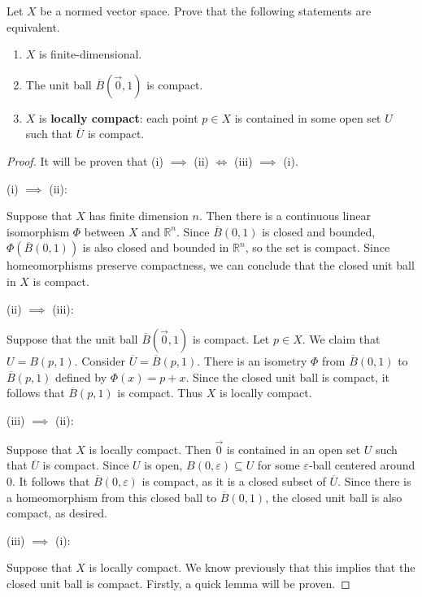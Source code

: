\documentclass{article}
\newcommand{\cl}[1]{\overline{#1}}
\theoremstyle{plain} %
\numberwithin{thm}{section} %
\theoremstyle{definition}
\begin{document}
        Let $X$ be a normed vector space. Prove that the following statements are equivalent.
        \begin{enumerate}[label=(\roman*)]
            \item $X$ is finite-dimensional.
            \item The unit ball $\cl{B}(\vec{0},1)$ is compact.
            \item $X$ is \textbf{locally compact}: each point $p\in X$ is contained in some open set $U$ such that $\cl{U}$ is compact.
        \end{enumerate}
        \begin{proof}
            It will be proven that (i) \(\implies\) (ii) \(\iff\) (iii) \(\implies\) (i).

            (i) \(\implies\)  (ii):

            Suppose that \(X\) has finite dimension \(n\). Then there is a continuous linear isomorphism \(\Phi\) between \(X\) and \(\mathbb{R}^n\). Since \(\cl{B}(0,1)\) is closed and bounded, \(\Phi (\cl{B}(0,1))\) is also closed and bounded in \(\mathbb{R}^n\), so the set is compact. Since homeomorphisms preserve compactness, we can conclude that the closed unit ball in \(X\) is compact.

            (ii) \(\implies\) (iii):

            Suppose that the unit ball \(\cl{B}(\vec{0}, 1)\) is compact. Let \(p \in X\). We claim that \(U = B(p,1)\). Consider \(\cl{U} = \cl{B}(p,1)\). There is an isometry \(\Phi\) from \(\cl{B}(0,1)\) to \(\cl{B}(p,1)\) defined by \(\Phi (x) = p + x\). Since the closed unit ball is compact, it follows that \(\cl{B}(p,1)\) is compact. Thus \(X\) is locally compact.

            (iii) \(\implies\) (ii):

            Suppose that \(X\) is locally compact. Then \(\vec{0}\) is contained in an open set \(U\) such that \(\cl{U}\) is compact. Since \(U\) is open, \(B(0, \varepsilon) \subseteq U\) for some \(\varepsilon\)-ball centered around 0. It follows that \(\cl{B}(0,\varepsilon)\) is compact, as it is a closed subset of \(\cl{U}\). Since there is a homeomorphism from this closed ball to \(\cl{B}(0,1)\), the closed unit ball is also compact, as desired.

            (iii) \(\implies\) (i):

            Suppose that \(X\) is locally compact. We know previously that this implies that the closed unit ball is compact. Firstly, a quick lemma will be proven.


\end{proof}
\end{document}
